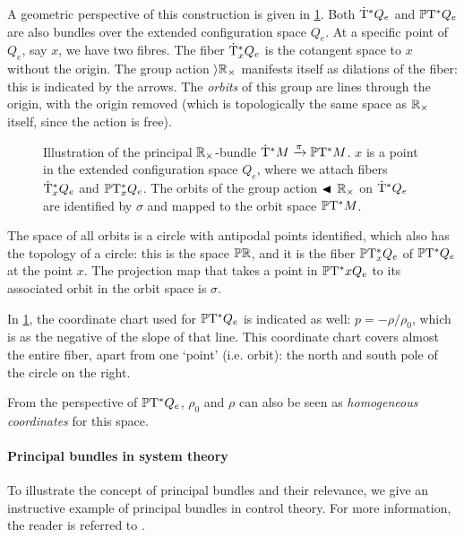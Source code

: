 A geometric perspective of this construction is given in \cref{fig:principal_bundle}. Both $\mathrm{\dot{T}}^*Q_e$ and $\mathbb{P}\mathrm{T}^* Q_e$ are also bundles over the extended configuration space $Q_e$. At a specific point of $Q_e$, say $x$, we have two fibres. The fiber $\mathrm{\dot{T}}^*_{x} Q_e$ is the cotangent space to $x$ without the origin. The group action $\rangle{\ensuremath{\mathbb{R}_{\times}}}$ manifests itself as dilations of the fiber: this is indicated by the arrows. The \emph{orbits} of this group are lines through the origin, with the origin removed (which is topologically the same space as $\mathbb{R}_{\times}$ itself, since the action is free). 
\begin{figure}[ht!]
    \centering
    
    \caption{Illustration of the principal $\mathbb{R}_{\times}$-bundle $\mathrm{\dot{T}}^*M\xrightarrow[]{\pi}\mathbb{P}\mathrm{T}^* M$. $x$ is a point in the extended configuration space $Q_e$, where we attach fibers $\mathrm{\dot{T}}^*_{x} Q_e$ and $\mathbb{P}\mathrm{T}^*_{x} Q_e$. The orbits of the group action $\blacktriangleleft\,\mathbb{R}_{\times}$ on $\mathrm{\dot{T}}^*Q_e$ are identified by $\sigma$ and mapped to the orbit space $\mathbb{P}\mathrm{T}^* M$. }
    \label{fig:principal_bundle}
\end{figure}

The space of all orbits is a circle with antipodal points identified, which also has the topology of a circle: this is the space $\mathbb{P}\mathbb{R}$, and it is the fiber $\mathbb{P}\mathrm{T}^*_{x} Q_e$ of $\mathbb{P}\mathrm{T}^* Q_e$ at the point $x$. The projection map that takes a point in $\mathbb{P}\mathrm{T}^* x{Q_e}$ to its associated orbit in the orbit space is $\sigma$. 

In \cref{fig:principal_bundle}, the coordinate chart used for $\mathbb{P}\mathrm{T}^* Q_e$ is indicated as well: $p = -\rho/\rho_0$, which is as the negative of the slope of that line. This coordinate chart covers almost the entire fiber, apart from one `point' (i.e. orbit): the north and south pole of the circle on the right.

From the perspective of $\mathbb{P}\mathrm{T}^* Q_e$, $\rho_0$ and $\rho$ can also be seen as \emph{homogeneous coordinates} for this space.

\paragraph{Principal bundles in system theory}
To illustrate the concept of principal bundles and their relevance, we give an instructive example of principal bundles in control theory. For more information, the reader is referred to \citet{Hermann1984}. 

